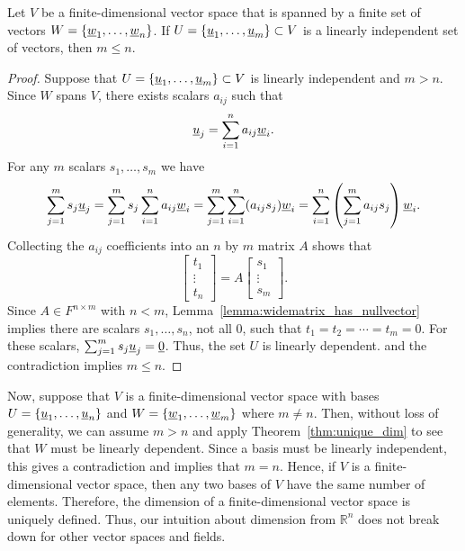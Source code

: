 \begin{theorem} \label{thm:unique_dim}
Let $V$ be a finite-dimensional  vector space that is spanned by a finite set of vectors $W = \left\{ \underline{w}_1, \ldots, \underline{w}_n \right\}$.
If $U = \left\{ \underline{u}_1, \ldots, \underline{u}_m \right\} \subset V$ is a linearly independent set of vectors, then $m\leq n$.
\end{theorem}
\begin{proof}
Suppose that $U = \left\{ \underline{u}_1, \ldots, \underline{u}_m \right\} \subset V$ is linearly independent and $m > n$.
Since $W$ spans $V$, there exists scalars $a_{ij}$ such that
\begin{equation*}
\underline{u}_j = \sum_{i=1}^n a_{ij} \underline{w}_i.
\end{equation*}
For any $m$ scalars $s_1, \ldots, s_m$ we have
\begin{equation*}
\sum_{j=1}^m s_j \underline{u}_j
= \sum_{j=1}^m s_j \sum_{i=1}^n a_{ij} \underline{w}_i
= \sum_{j=1}^m \sum_{i=1}^n ( a_{ij} s_j ) \underline{w}_i
= \sum_{i=1}^n \left( \sum_{j=1}^m a_{ij} s_j \right) \underline{w}_i . 
\end{equation*}
Collecting the $a_{ij}$ coefficients into an $n$ by $m$ matrix $A$ shows that
\begin{equation*}
\begin{bmatrix} t_1 \\ \vdots \\ t_n \end{bmatrix} = A \begin{bmatrix} s_1 \\ \vdots \\ s_m \end{bmatrix} .
\end{equation*}
Since $A\in F^{n\times m}$ with $n<m$, Lemma~\ref{lemma:widematrix_has_nullvector} implies there are scalars $s_1, \ldots, s_n$, not all $0$, such that $t_1 = t_2 = \cdots = t_m = 0$.
For these scalars, $\sum_{j=1}^m s_j \underline{u}_j = \underline{0}$.
Thus, the set $U$ is linearly dependent.
and the contradiction implies $m \leq n$.
\end{proof}

Now, suppose that $V$ is a finite-dimensional vector space with bases $U=\{\underline{u}_1, \ldots, \underline{u}_n\}$ and $W =\{\underline{w}_1, \ldots, \underline{w}_m\}$ where $m \neq n$.
Then, without loss of generality, we can assume $m > n$ and apply Theorem~\ref{thm:unique_dim} to see that $W$ must be linearly dependent.
Since a basis must be linearly independent, this gives a contradiction and implies that $m = n$.
Hence, if $V$ is a finite-dimensional vector space, then any two bases of $V$ have the same number of elements.
Therefore, the dimension of a finite-dimensional vector space is uniquely defined.
Thus, our intuition about dimension from $\mathbb{R}^n$ does not break down for other vector spaces and fields.

